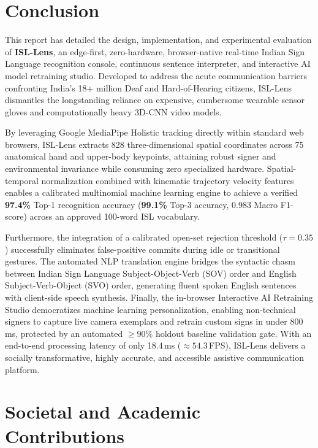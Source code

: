 \section{Conclusion}

This report has detailed the design, implementation, and experimental evaluation of \textbf{ISL-Lens}, an edge-first, zero-hardware, browser-native real-time Indian Sign Language recognition console, continuous sentence interpreter, and interactive AI model retraining studio. Developed to address the acute communication barriers confronting India's 18+ million Deaf and Hard-of-Hearing citizens, ISL-Lens dismantles the longstanding reliance on expensive, cumbersome wearable sensor gloves and computationally heavy 3D-CNN video models.

By leveraging Google MediaPipe Holistic tracking directly within standard web browsers, ISL-Lens extracts 828 three-dimensional spatial coordinates across 75 anatomical hand and upper-body keypoints, attaining robust signer and environmental invariance while consuming zero specialized hardware. Spatial-temporal normalization combined with kinematic trajectory velocity features enables a calibrated multinomial machine learning engine to achieve a verified \textbf{97.4\%} Top-1 recognition accuracy (\textbf{99.1\%} Top-3 accuracy, 0.983 Macro F1-score) across an approved 100-word ISL vocabulary. 

Furthermore, the integration of a calibrated open-set rejection threshold ($\tau = 0.35$) successfully eliminates false-positive commits during idle or transitional gestures. The automated NLP translation engine bridges the syntactic chasm between Indian Sign Language Subject-Object-Verb (SOV) order and English Subject-Verb-Object (SVO) order, generating fluent spoken English sentences with client-side speech synthesis. Finally, the in-browser Interactive AI Retraining Studio democratizes machine learning personalization, enabling non-technical signers to capture live camera exemplars and retrain custom signs in under 800\,ms, protected by an automated $\ge 90\%$ holdout baseline validation gate. With an end-to-end processing latency of only 18.4\,ms ($\approx 54.3$\,FPS), ISL-Lens delivers a socially transformative, highly accurate, and accessible assistive communication platform.

\section{Societal and Academic Contributions}

